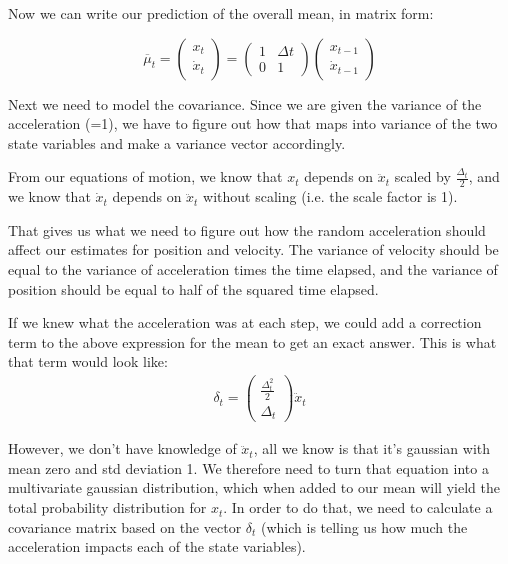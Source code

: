 \documentclass[10pt]{article}
\begin{document}
\begin{enumerate}
\begin{enumerate}
      Now we can write our prediction of the overall mean, in matrix form:

      $$
    \overline{\mu}_t = \begin{pmatrix}x_t \\ \dot{x}_t\end{pmatrix} = 
    \begin{pmatrix}1 & \Delta t \\ 0 & 1\end{pmatrix} \begin{pmatrix}x_{t-1} \\
    \dot{x}_{t-1} \end{pmatrix}
      $$

      Next we need to model the covariance. Since we are given the variance of the
      acceleration (=1), we have to figure out how that maps into variance of the
      two state variables and make a variance vector accordingly.

      From our equations of motion, we know that $x_t$ depends on $\ddot{x}_t$
      scaled by $\frac{\Delta_t}{2}$, and we know that $\dot{x}_t$ depends on
      $\ddot{x}_t$ without scaling (i.e. the scale factor is 1).

      That gives us what we need to figure out how the random acceleration should
      affect our estimates for position and velocity. The variance of velocity
      should be equal to the variance of acceleration times the time elapsed, and
      the variance of position should be equal to half of the squared time elapsed. 

      If we knew what the acceleration was at each step, we could add a correction
      term to the above expression for the mean to get an exact answer. This is what
      that term would look like:
      \begin{gather}
      \delta_t = \begin{pmatrix}\frac{\Delta_t^2}{2} \\ \Delta_t\end{pmatrix} \ddot{x}_t
      \end{gather}

      However, we don't have knowledge of $\ddot{x}_t$, all we know is that it's
      gaussian with mean zero and std deviation 1. We therefore need to turn that
      equation into a multivariate gaussian distribution, which when added to our
      mean will yield the total probability distribution for $x_t$. In order to do
      that, we need to calculate a covariance matrix based on the vector $\delta_t$
      (which is telling us how much the acceleration impacts each of the state
      variables).


\end{enumerate}
\end{enumerate}
\end{document}
